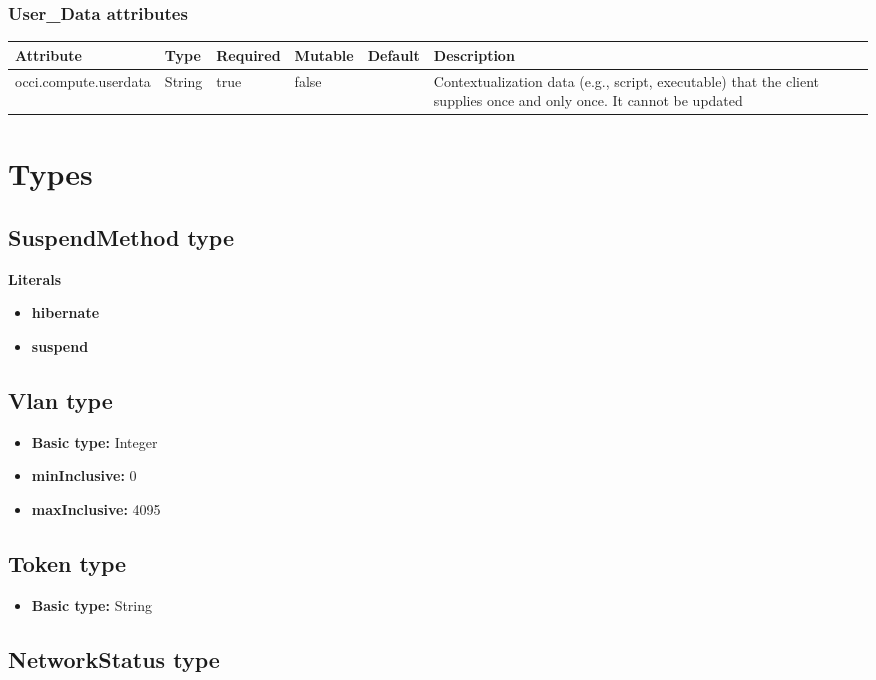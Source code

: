 \documentclass{article}
\begin{document}
\subsubsection{User\_Data attributes}
\begin{tabularx}{\textwidth}{|l|l|p{1.4cm}|p{1.3cm}|l|X|}
  \hline
  \textbf{Attribute} & \textbf{Type} & \textbf{Required} & \textbf{Mutable} & \textbf{Default} & \textbf{Description} \\
  \hline  
  occi.compute.userdata & String & true & false &  & Contextualization data (e.g., script, executable) that the client supplies once and only once. It cannot be updated \\
  \hline
\end{tabularx}


\section{Types}
\subsection{SuspendMethod type}

\textbf{Literals}
\begin{itemize}
\item \textbf{hibernate} 
\end{itemize}
\begin{itemize}
\item \textbf{suspend} 
\end{itemize}

\subsection{Vlan type}

\begin{itemize}
\item \textbf{Basic type:} Integer
	\item \textbf{minInclusive:} 0
	\item \textbf{maxInclusive:} 4095
\end{itemize}
\subsection{Token type}

\begin{itemize}
\item \textbf{Basic type:} String
\end{itemize}
\subsection{NetworkStatus type}
\end{document}
